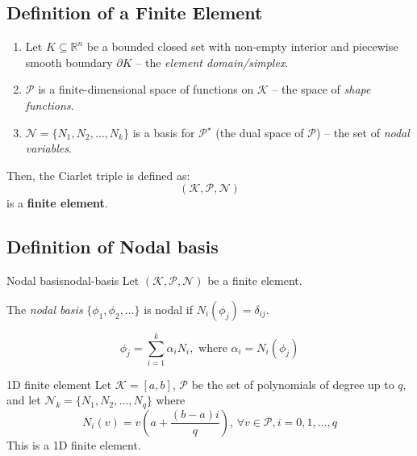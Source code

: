 \subsection{Definition of a Finite Element}
\begin{enumerate}
    \item Let $K \subseteq \mathbb{R}^n$ be a bounded closed set with non-empty interior and piecewise smooth boundary $\partial K$ -- the \emph{element domain/simplex}.
    \item $\mathcal{P}$ is a finite-dimensional space of functions on $\mathcal{K}$ -- the space of \emph{shape functions}.
    \item $\mathcal{N} = \{N_1, N_2, \ldots, N_k\}$ is a basis for $\mathcal{P}^\star$ (the dual space of $\mathcal{P}$) -- the set of \emph{nodal variables}.
\end{enumerate}
Then, the Ciarlet triple is defined as:
\[
    (\mathcal{K}, \mathcal{P}, \mathcal{N})
\]
is a \textbf{finite element}.

\subsection{Definition of Nodal basis}
\begin{definition}{Nodal basis}{nodal-basis}
    Let $(\mathcal{K}, \mathcal{P}, \mathcal{N})$ be a finite element.

    The \emph{nodal basis} $\{\phi_1, \phi_2, \ldots\}$ is nodal if $N_i(\phi_j) = \delta_{ij}$.

    \[
        \phi_j = \sum_{i=1}^k \alpha_i N_i, \text{ where } \alpha_i = N_i(\phi_j)
    \]
\end{definition}

\begin{example}{1D finite element}{}
    Let $\mathcal{K} = [a, b]$, $\mathcal{P}$ be the set of polynomials of degree up to $q$, and let $\mathcal{N}_k = \{N_1, N_2, \ldots, N_q\}$ where
    \[
        N_i(v) = v(a + \frac{(b - a)i}{q}), \, \forall v \in \mathcal{P}, i = 0, 1, \ldots, q
    \]
    This is a 1D finite element.
\end{example}
\begin{center}
\end{center}


